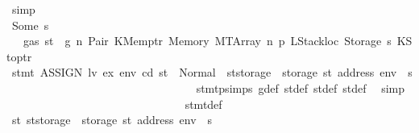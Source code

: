 \begin{isabellebody}
\ simp\isanewline
\ \ \ \ \ \ \ \ \ \ \ \ \ \ \ \ \ \ \ \ \ \ \ \ \ \ \ \ \isamarkupfalse%
\isanewline
\ \ \ \ \ \ \ \ \ \ \ \ \ \ \ \ \ \ \ \ \ \ \ \ \ \ \ \ \ \ \isamarkupfalse%
\ {\isacharparenleft}{\kern0pt}Some\ s{\isacharparenright}{\kern0pt}\isanewline
\ \ \ \ \ \ \ \ \ \ \ \ \ \ \ \ \ \ \ \ \ \ \ \ \ \ \ \ \ \ \isamarkupfalse%
\ {}{\isacharparenleft}{\kern0pt}{}{\isacharparenright}{\kern0pt}\ {\isacharbackquoteopen}{\isasymnot}\ gas\ st\ {\isasymle}\ g{\isacharbackquoteclose}\ n\ Pair\ KMemptr\ Memory\ MTArray\ n{}\ p{}\ LStackloc\ Storage\ s{}\ KStoptr\isanewline
\ \ \ \ \ \ \ \ \ \ \ \ \ \ \ \ \ \ \ \ \ \ \ \ \ \ \ \ \ \ \isamarkupfalse%
\ {\isachardoublequoteopen}stmt\ {\isacharparenleft}{\kern0pt}ASSIGN\ lv\ ex{\isacharparenright}{\kern0pt}\ env\ cd\ st\ {\isacharequal}{\kern0pt}\ Normal\ {\isacharparenleft}{\kern0pt}{\isacharparenleft}{\kern0pt}{\isacharparenright}{\kern0pt}{\isacharcomma}{\kern0pt}\ st{\isacharprime}{\kern0pt}{\isacharprime}{\kern0pt}{\isacharprime}{\kern0pt}{\isasymlparr}storage\ {\isacharcolon}{\kern0pt}{\isacharequal}{\kern0pt}\ {\isacharparenleft}{\kern0pt}storage\ st{\isacharprime}{\kern0pt}{\isacharprime}{\kern0pt}{\isacharprime}{\kern0pt}{\isacharparenright}{\kern0pt}\ {\isacharparenleft}{\kern0pt}address\ env\ {\isacharcolon}{\kern0pt}{\isacharequal}{\kern0pt}\ s{\isacharparenright}{\kern0pt}{\isasymrparr}{\isacharparenright}{\kern0pt}{\isachardoublequoteclose}\isanewline
\ \ \ \ \ \ \ \ \ \ \ \ \ \ \ \ \ \ \ \ \ \ \ \ \ \ \ \ \ \ \ \ \isamarkupfalse%
\ stmt{\isachardot}{\kern0pt}psimps{\isacharparenleft}{\kern0pt}{}{\isacharparenright}{\kern0pt}\ g{\isacharunderscore}{\kern0pt}def\ st{\isacharprime}{\kern0pt}{\isacharunderscore}{\kern0pt}def\ st{\isacharprime}{\kern0pt}{\isacharprime}{\kern0pt}{\isacharunderscore}{\kern0pt}def\ st{\isacharprime}{\kern0pt}{\isacharprime}{\kern0pt}{\isacharprime}{\kern0pt}{\isacharunderscore}{\kern0pt}def\ \isamarkupfalse%
\ simp\isanewline
\ \ \ \ \ \ \ \ \ \ \ \ \ \ \ \ \ \ \ \ \ \ \ \ \ \ \ \ \ \ \isamarkupfalse%
\ stmt{\isacharunderscore}{\kern0pt}def\ \isamarkupfalse%
\ {\isachardoublequoteopen}st{}{\isacharprime}{\kern0pt}{\isacharequal}{\kern0pt}\ st{\isacharprime}{\kern0pt}{\isacharprime}{\kern0pt}{\isacharprime}{\kern0pt}{\isasymlparr}storage\ {\isacharcolon}{\kern0pt}{\isacharequal}{\kern0pt}\ {\isacharparenleft}{\kern0pt}storage\ st{\isacharprime}{\kern0pt}{\isacharprime}{\kern0pt}{\isacharprime}{\kern0pt}{\isacharparenright}{\kern0pt}\ {\isacharparenleft}{\kern0pt}address\ env\ {\isacharcolon}{\kern0pt}{\isacharequal}{\kern0pt}\ s{\isacharparenright}{\kern0pt}{\isasymrparr}{\isachardoublequoteclose}\ \isamarkupfalse%

\end{isabellebody}
